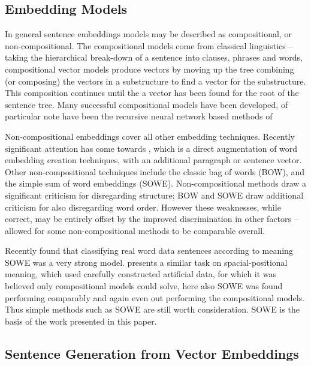 \documentclass[11pt]{article}
\numberwithin{equation}{section}
\numberwithin{figure}{section}
\theoremstyle{plain}
\theoremstyle{definition}
\begin{document}
\subsection{Embedding Models}
In general sentence embeddings models may be described as compositional, or non-compositional.
The compositional models come from classical linguistics -- taking the hierarchical  break-down of a sentence into clauses, phrases and words, compositional vector models produce vectors by moving up the tree combining (or composing) the vectors in a substructure to find a vector for the substructure. This composition continues until the a vector has been found for the root of the sentence tree. Many successful compositional models have been developed, of particular note have been the recursive neural network based methods of  \textcite{socher2010PhraseEmbedding}%

Non-compositional embeddings cover all other embedding techniques. Recently significant attention has come towards  \textcite{le2014distributed}, which is a direct augmentation of word embedding creation techniques, with an additional paragraph or sentence vector. Other non-compositional techniques include the classic bag of words (BOW), and the simple sum of word embeddings (SOWE). Non-compositional methods draw a significant criticism for disregarding structure; BOW and SOWE draw additional criticism for also disregarding word order. However these weaknesses, while correct, may be entirely offset by the improved discrimination in other factors -- allowed for some non-compositional methods to be comparable overall. 


Recently \textcite{White2015SentVecMeaning} found that classifying real word data sentences according to meaning SOWE was a very strong model. \textcite{RitterPosition} presents a similar task on spacial-positional meaning, which used carefully constructed artificial data, for which it was believed only compositional models could solve, here also SOWE was found performing comparably and again even out performing the compositional models. Thus simple methods such as SOWE are still worth consideration. SOWE is the basis of the work presented in this paper.

\subsection{Sentence Generation from Vector Embeddings}
\end{document}
